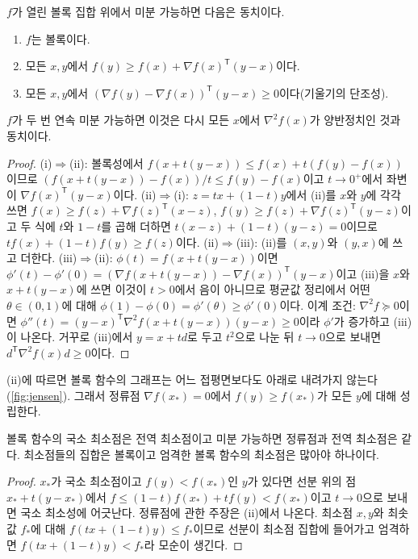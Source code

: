 \begin{theorem}
\label{thm:convex-characterization}
$f$가 열린 볼록 집합 위에서 미분 가능하면 다음은 동치이다.
\begin{enumerate}
\item $f$는 볼록이다.
\item 모든 $x,y$에서 $f(y)\ge f(x)+\nabla f(x)^{\mathsf T}(y-x)$이다.
\item 모든 $x,y$에서 $(\nabla f(y)-\nabla f(x))^{\mathsf T}(y-x)\ge0$이다(기울기의 단조성).
\end{enumerate}
$f$가 두 번 연속 미분 가능하면 이것은 다시 모든 $x$에서 $\nabla^2f(x)$가 양반정치인 것과 동치이다.
\end{theorem}

\begin{proof}
(i)$\Rightarrow$(ii): 볼록성에서 $f(x+t(y-x))\le f(x)+t(f(y)-f(x))$이므로 $(f(x+t(y-x))-f(x))/t\le f(y)-f(x)$이고 $t\to0^+$에서 좌변이 $\nabla f(x)^{\mathsf T}(y-x)$이다. (ii)$\Rightarrow$(i): $z=tx+(1-t)y$에서 (ii)를 $x$와 $y$에 각각 쓰면 $f(x)\ge f(z)+\nabla f(z)^{\mathsf T}(x-z)$, $f(y)\ge f(z)+\nabla f(z)^{\mathsf T}(y-z)$이고 두 식에 $t$와 $1-t$를 곱해 더하면 $t(x-z)+(1-t)(y-z)=0$이므로 $tf(x)+(1-t)f(y)\ge f(z)$이다. (ii)$\Rightarrow$(iii): (ii)를 $(x,y)$와 $(y,x)$에 쓰고 더한다. (iii)$\Rightarrow$(ii): $\phi(t)=f(x+t(y-x))$이면 $\phi'(t)-\phi'(0)=(\nabla f(x+t(y-x))-\nabla f(x))^{\mathsf T}(y-x)$이고 (iii)을 $x$와 $x+t(y-x)$에 쓰면 이것이 $t>0$에서 음이 아니므로 평균값 정리에서 어떤 $\theta\in(0,1)$에 대해 $\phi(1)-\phi(0)=\phi'(\theta)\ge\phi'(0)$이다. 이계 조건: $\nabla^2f\succeq0$이면 $\phi''(t)=(y-x)^{\mathsf T}\nabla^2f(x+t(y-x))(y-x)\ge0$이라 $\phi'$가 증가하고 (iii)이 나온다. 거꾸로 (iii)에서 $y=x+td$로 두고 $t^2$으로 나눈 뒤 $t\to0$으로 보내면 $d^{\mathsf T}\nabla^2f(x)d\ge0$이다.
\end{proof}

(ii)에 따르면 볼록 함수의 그래프는 어느 접평면보다도 아래로 내려가지 않는다(\cref{fig:jensen}). 그래서 정류점 $\nabla f(x_\ast)=0$에서 $f(y)\ge f(x_\ast)$가 모든 $y$에 대해 성립한다.

\begin{corollary}
\label{cor:convex-global}
볼록 함수의 국소 최소점은 전역 최소점이고 미분 가능하면 정류점과 전역 최소점은 같다. 최소점들의 집합은 볼록이고 엄격한 볼록 함수의 최소점은 많아야 하나이다.
\end{corollary}

\begin{proof}
$x_\ast$가 국소 최소점이고 $f(y)<f(x_\ast)$인 $y$가 있다면 선분 위의 점 $x_\ast+t(y-x_\ast)$에서 $f\le(1-t)f(x_\ast)+tf(y)<f(x_\ast)$이고 $t\to0$으로 보내면 국소 최소성에 어긋난다. 정류점에 관한 주장은 (ii)에서 나온다. 최소점 $x,y$와 최솟값 $f_\ast$에 대해 $f(tx+(1-t)y)\le f_\ast$이므로 선분이 최소점 집합에 들어가고 엄격하면 $f(tx+(1-t)y)<f_\ast$라 모순이 생긴다.
\end{proof}

